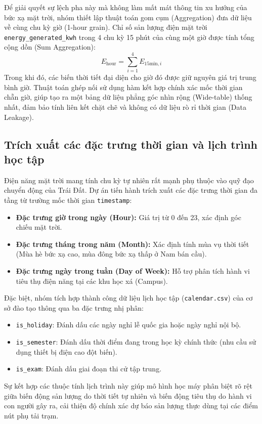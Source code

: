 \documentclass[12pt, a4paper]{report}
\begin{document}
Để giải quyết sự lệch pha này mà không làm mất mát thông tin xu hướng của bức xạ mặt trời, nhóm thiết lập thuật toán gom cụm (Aggregation) đưa dữ liệu về cùng chu kỳ giờ (1-hour grain). Chỉ số sản lượng điện mặt trời \texttt{energy\_generated\_kwh} trong 4 chu kỳ 15 phút của cùng một giờ được tính tổng cộng dồn (Sum Aggregation):
\begin{equation}
E_{\text{hour}} = \sum_{i=1}^{4} E_{15\text{min}, i}
\end{equation}
Trong khi đó, các biến thời tiết đại diện cho giờ đó được giữ nguyên giá trị trung bình giờ. Thuật toán ghép nối sử dụng hàm kết hợp chính xác mốc thời gian chẵn giờ, giúp tạo ra một bảng dữ liệu phẳng góc nhìn rộng (Wide-table) thống nhất, đảm bảo tính liên kết chặt chẽ và không có dữ liệu rò rỉ thời gian (Data Leakage).

\subsection{Trích xuất các đặc trưng thời gian và lịch trình học tập}
Điện năng mặt trời mang tính chu kỳ tự nhiên rất mạnh phụ thuộc vào quỹ đạo chuyển động của Trái Đất. Dự án tiến hành trích xuất các đặc trưng thời gian đa tầng từ trường mốc thời gian \texttt{timestamp}:
\begin{itemize}
    \item \textbf{Đặc trưng giờ trong ngày (Hour):} Giá trị từ 0 đến 23, xác định góc chiếu mặt trời.
    \item \textbf{Đặc trưng tháng trong năm (Month):} Xác định tính mùa vụ thời tiết (Mùa hè bức xạ cao, mùa đông bức xạ thấp ở Nam bán cầu).
    \item \textbf{Đặc trưng ngày trong tuần (Day of Week):} Hỗ trợ phân tích hành vi tiêu thụ điện năng tại các khu học xá (Campus).
\end{itemize}

Đặc biệt, nhóm tích hợp thành công dữ liệu lịch học tập (\texttt{calendar.csv}) của cơ sở đào tạo thông qua ba đặc trưng nhị phân:
\begin{itemize}
    \item \texttt{is\_holiday}: Đánh dấu các ngày nghỉ lễ quốc gia hoặc ngày nghỉ nội bộ.
    \item \texttt{is\_semester}: Đánh dấu thời điểm đang trong học kỳ chính thức (nhu cầu sử dụng thiết bị điện cao đột biến).
    \item \texttt{is\_exam}: Đánh dấu giai đoạn thi cử tập trung.
\end{itemize}
Sự kết hợp các thuộc tính lịch trình này giúp mô hình học máy phân biệt rõ rệt giữa biến động sản lượng do thời tiết tự nhiên và biến động tiêu thụ do hành vi con người gây ra, cải thiện độ chính xác dự báo sản lượng thực dùng tại các điểm nút phụ tải trạm.
\end{document}
